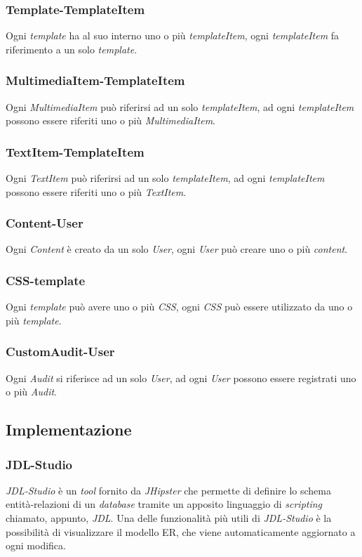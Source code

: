 \subsubsection{Template-TemplateItem}
Ogni \textit{template} ha al suo interno uno o più \textit{templateItem}, ogni \textit{templateItem} fa riferimento a un solo \textit{template}.
\subsubsection{MultimediaItem-TemplateItem}
Ogni \textit{MultimediaItem} può riferirsi ad un solo \textit{templateItem}, ad ogni \textit{templateItem} possono essere riferiti uno o più \textit{MultimediaItem}.
\subsubsection{TextItem-TemplateItem}
Ogni \textit{TextItem} può riferirsi ad un solo \textit{templateItem}, ad ogni \textit{templateItem} possono essere riferiti uno o più \textit{TextItem}.
\subsubsection{Content-User}
Ogni \textit{Content} è creato da un solo \textit{User}, ogni \textit{User} può creare uno o più \textit{content}.
\subsubsection{CSS-template}
Ogni \textit{template} può avere uno o più \textit{CSS}, ogni \textit{CSS} può essere utilizzato da uno o più \textit{template}.
\subsubsection{CustomAudit-User}
Ogni \textit{Audit} si riferisce ad un solo \textit{User}, ad ogni \textit{User} possono essere registrati uno o più \textit{Audit}.


\subsection{Implementazione}
\subsubsection{JDL-Studio}
\textit{JDL-Studio} è un \textit{tool} fornito da \textit{JHipster} che permette di definire lo schema entità-relazioni di un \textit{database} tramite un apposito linguaggio di \textit{scripting} chiamato, appunto, \textit{JDL}. Una delle funzionalità più utili di \textit{JDL-Studio} è la possibilità di visualizzare il modello ER, che viene automaticamente aggiornato a ogni modifica.
\newpage
